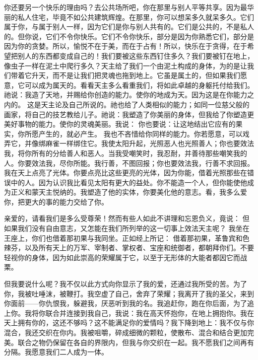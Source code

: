 你还要另一个快乐的理由吗？去公共场所吧，你在那里与别人平等共享。因为最华丽的私人住宅，毕竟不如公共建筑辉煌。在那里，你可以想呆多久就呆多久。它们属于你，与属于别人一样，因为它们是你与别人共有的。它们是公共的，不是私人的。但你说，它们不令你快乐。它们不令你快乐，部分是因为你熟悉它们，部分是因为你的贪婪。所以，愉悦不在于美，而在于占有！所以，快乐在于贪得，在于希望把别人的东西都变成自己的！我们要被这些东西钉住多久？我们要被钉在地上，像虫子一样在泥土中爬行多久？天主给了我们一个由泥土构成的身体，为的是让我们带着它升天，而不是让我们把灵魂也拖到地上。它虽是属土的，但如果我们愿意，它可以成为属天的。看看天主多么看重我们，将如此卓越的身躯托付给我们。祂说：我造了天地，并赐给你创造的能力。使你的地成为天。因为这是在你能力之内的。 这是天主论及自己所说的。祂也给了人类相似的能力；如同一位慈父般的画家，将自己的技艺教给儿子。祂说：我塑造了你美丽的身体，但我给了你塑造更美好事物的能力。使你的灵魂美丽。我说： 你也要说：让这地结出它应有的果实，你所愿产生的，就必产生。  我也不吝惜给你同样的能力。你若愿意，可以戏弄它，并像绑麻雀一样绑住它。我使太阳升起，光照恶人也光照善人；你也要效法我，将你所有的分给善人和恶人。当我受嘲笑时，我忍耐，并善待那些嘲笑我的人。你要效法我，尽你所能。我行善，不图回报；你也要效法我，行善不求回报。我在天上点亮了光体。你要点亮比这些更亮的光体，因为你能，借着光照那些在错误中的人。因为认识我比看见太阳有更大的益处。你不能造一个人，但你能使他成为正义和蒙天主悦纳的。我塑造了他的实体，你要美化他的意志。看，我多么爱你，把更大的事的能力交给了你。\par

亲爱的，请看我们是多么受尊荣！然而有些人如此不讲理和忘恩负义，竟说： 但如果我们没有自由意志，又怎能在我们所列举的这一切事上效法天主呢？ 我坐在王座上，你们也借着那初果与我同坐。正如经上所记： 借着那初果，革鲁宾和色辣芬，以及所有天上的万军、宰制者、掌权者、宝座和统御者，都朝拜你们。不要轻视你的身体，因为如此崇高的荣耀属于它，以至于无形体的大能者都因它而战栗。\par

但我要说什么呢？我不仅以此方式向你显示了我的爱，还通过我所受的苦。为了你，我被吐唾沫，被鞭打。我空虚了自己，舍弃了荣耀；我离开了我的圣父，来到你面前——你仇恨我，躲避我，厌恶听到我的名。我追赶你，跑在你后面，为了追上你。我将你联合并连接到我自己，我说：我在高天怀抱你，在地上拥抱你。我在天上拥有你的，这还不够吗？这不能满足你的爱情吗？我下降到地上：我不仅与你混合，我还交织在你内。我被咀嚼，碎成细微的颗粒，使散布、混合和结合更加完美。联合之物仍保留在各自的界限内，但我与你交织在一起。我不愿我们之间再有分隔。我愿意我们二人成为一体。\par

